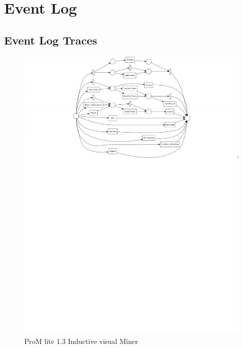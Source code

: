 

\section{Event Log}


\subsection{Event Log Traces}


\begin{figure}[!htb]
        \centering 
    \includegraphics[width =\textwidth, trim =1cm 17cm 0cm 0cm, clip]{resource/problem2.pdf}
    \caption{ProM lite 1.3 Inductive visual Miner}
    \label{figure:eventLogTraces2}

\end{figure}




